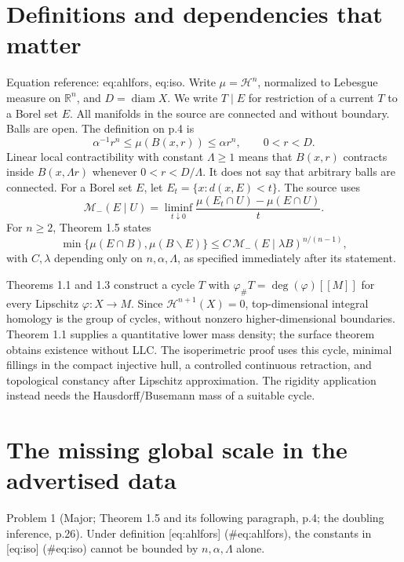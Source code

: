\documentclass[10pt]{article}
\begin{document}
\section*{Definitions and dependencies that matter}
Equation reference: eq:ahlfors, eq:iso. Write \(\mu=\mathcal H^n\), normalized to Lebesgue measure on \(\mathbb R^n\), and \(D=\operatorname{diam}X\). We write \(T\mathbin{\vert}E\) for restriction of a current \(T\) to a Borel set \(E\). All manifolds in the source are connected and without boundary. Balls are open. The definition on p.4 is \[
 \alpha^{-1}r^n\le\mu(B(x,r))\le\alpha r^n,
 \qquad 0<r<D.\] Linear local contractibility with constant \(\Lambda\ge1\) means that \(B(x,r)\) contracts inside \(B(x,\Lambda r)\) whenever \(0<r<D/\Lambda\). It does not say that arbitrary balls are connected. For a Borel set \(E\), let \(E_t=\{x:d(x,E)<t\}\). The source uses \[\mathcal M_-(E\mid U)=\liminf_{t\downarrow0}
       \frac{\mu(E_t\cap U)-\mu(E\cap U)}{t}.\] For \(n\ge2\), Theorem 1.5 states \[
 \min\{\mu(E\cap B),\mu(B\smallsetminus E)\}
 \le C\,\mathcal M_-(E\mid\lambda B)^{n/(n-1)},\] with \(C,\lambda\) depending only on \(n,\alpha,\Lambda\), as specified immediately after its statement.\par
Theorems 1.1 and 1.3 construct a cycle \(T\) with \(\varphi_\#T=\deg(\varphi)[\![M]\!]\) for every Lipschitz \(\varphi:X\to M\). Since \(\mathcal H^{n+1}(X)=0\), top-dimensional integral homology is the group of cycles, without nonzero higher-dimensional boundaries. Theorem 1.1 supplies a quantitative lower mass density; the surface theorem obtains existence without LLC. The isoperimetric proof uses this cycle, minimal fillings in the compact injective hull, a controlled continuous retraction, and topological constancy after Lipschitz approximation. The rigidity application instead needs the Hausdorff/Busemann mass of a suitable cycle.\par
\section*{The missing global scale in the advertised data}
Problem 1 (Major; Theorem 1.5 and its following paragraph, p.4; the doubling inference, p.26).  Under definition [eq:ahlfors] (\#eq:ahlfors), the constants in [eq:iso] (\#eq:iso) cannot be bounded by \(n,\alpha,\Lambda\) alone.\par
\end{document}
